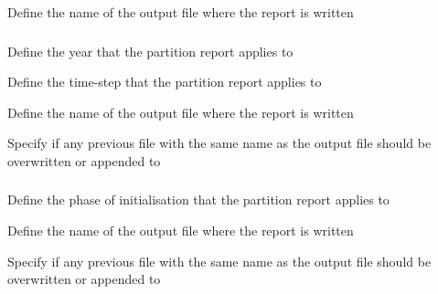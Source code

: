  {Define the name of the output file where the report is written}

\subsubsection[Print the partition]{}

 {Define the year that the partition report applies to}

 {Define the time-step that the partition report applies to}

 {Define the name of the output file where the report is written}

 {Specify if any previous file with the same name as the output file should be overwritten or appended to}

\subsubsection[Print the partition at initialisation]{}

 {Define the phase of initialisation that the partition report applies to}

 {Define the name of the output file where the report is written}

 {Specify if any previous file with the same name as the output file should be overwritten or appended to}

\subsubsection[Print a summary of a process]{}

